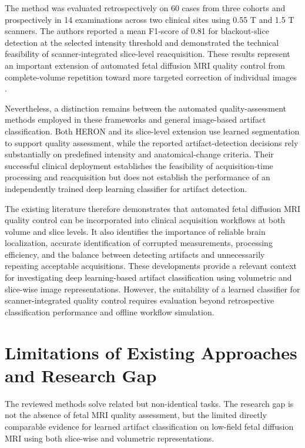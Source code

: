 The method was evaluated retrospectively on 60 cases from three cohorts and prospectively in 14 examinations across two clinical sites using 0.55 T and 1.5 T scanners. The authors reported a mean F1-score of 0.81 for blackout-slice detection at the selected intensity threshold and demonstrated the technical feasibility of scanner-integrated slice-level reacquisition. These results represent an important extension of automated fetal diffusion MRI quality control from complete-volume repetition toward more targeted correction of individual images \autocite{avilesverdera2026slicereacquisition}.

Nevertheless, a distinction remains between the automated quality-assessment methods employed in these frameworks and general image-based artifact classification. Both HERON and its slice-level extension use learned segmentation to support quality assessment, while the reported artifact-detection decisions rely substantially on predefined intensity and anatomical-change criteria. Their successful clinical deployment establishes the feasibility of acquisition-time processing and reacquisition but does not establish the performance of an independently trained deep learning classifier for artifact detection.

The existing literature therefore demonstrates that automated fetal diffusion MRI quality control can be incorporated into clinical acquisition workflows at both volume and slice levels. It also identifies the importance of reliable brain localization, accurate identification of corrupted measurements, processing efficiency, and the balance between detecting artifacts and unnecessarily repeating acceptable acquisitions. These developments provide a relevant context for investigating deep learning-based artifact classification using volumetric and slice-wise image representations. However, the suitability of a learned classifier for scanner-integrated quality control requires evaluation beyond retrospective classification performance and offline workflow simulation.

\section{Limitations of Existing Approaches and Research Gap}

The reviewed methods solve related but non-identical tasks. The research gap is not the absence of fetal MRI quality assessment, but the limited directly comparable evidence for learned artifact classification on low-field fetal diffusion MRI using both slice-wise and volumetric representations.

